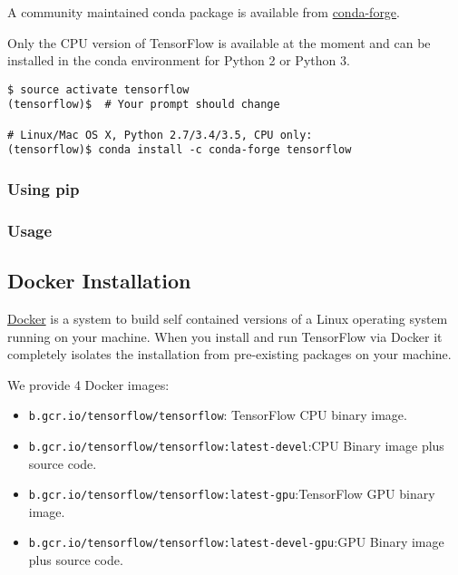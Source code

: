 A community maintained conda package is available from \href{https://github.com/conda-forge/tensorflow-feedstock}{conda-forge}.

Only the CPU version of TensorFlow is available at the moment and can be installed in the conda environment for Python 2 or Python 3.

\begin{lstlisting}
$ source activate tensorflow
(tensorflow)$  # Your prompt should change

# Linux/Mac OS X, Python 2.7/3.4/3.5, CPU only:
(tensorflow)$ conda install -c conda-forge tensorflow
\end{lstlisting}


\subsubsection {Using pip}



\subsubsection {Usage}







%
\subsection {Docker Installation} \label{docker_install}
\href{http://docker.com/}{Docker} is a system to build self contained versions of a Linux operating system running on your machine. When you install and run TensorFlow via Docker it completely isolates the installation from pre-existing packages on your machine.

We provide 4 Docker images:

\begin{itemize}
\item \lstinline{b.gcr.io/tensorflow/tensorflow}: TensorFlow CPU binary image.
\item \lstinline{b.gcr.io/tensorflow/tensorflow:latest-devel}:CPU Binary image plus source code.
\item \lstinline{b.gcr.io/tensorflow/tensorflow:latest-gpu}:TensorFlow GPU binary image.
\item \lstinline{b.gcr.io/tensorflow/tensorflow:latest-devel-gpu}:GPU Binary image plus source code.
\end{itemize}

